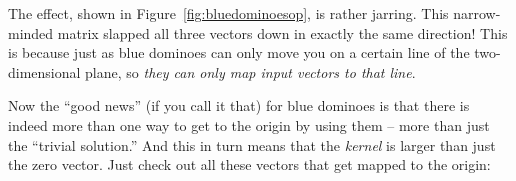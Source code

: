 The effect, shown in Figure~\ref{fig:bluedominoesop}, is rather jarring. This
narrow-minded matrix slapped all three vectors down in exactly the same
direction! This is because just as blue dominoes can only move you on a certain
line of the two-dimensional plane, so \textit{they can only map input vectors
to that line}.


Now the ``good news'' (if you call it that) for blue dominoes is that there is
indeed more than one way to get to the origin by using them -- more than just
the ``trivial solution.'' And this in turn means that the \textit{kernel} is
larger than just the zero vector. Just check out all these vectors that get
mapped to the origin:

\vspace{-.15in}
